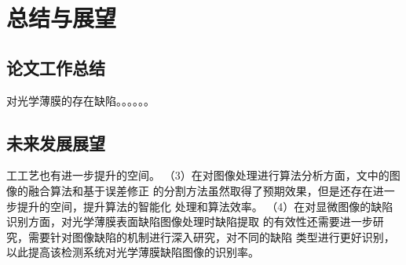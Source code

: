\chapter{总结与展望}
\section{论文工作总结}
对光学薄膜的存在缺陷。。。。。。
\section{未来发展展望}
工工艺也有进一步提升的空间。 （3）在对图像处理进行算法分析方面，文中的图像的融合算法和基于误差修正 的分割方法虽然取得了预期效果，但是还存在进一步提升的空间，提升算法的智能化 处理和算法效率。 （4）在对显微图像的缺陷识别方面，对光学薄膜表面缺陷图像处理时缺陷提取 的有效性还需要进一步研究，需要针对图像缺陷的机制进行深入研究，对不同的缺陷 类型进行更好识别，以此提高该检测系统对光学薄膜缺陷图像的识别率。